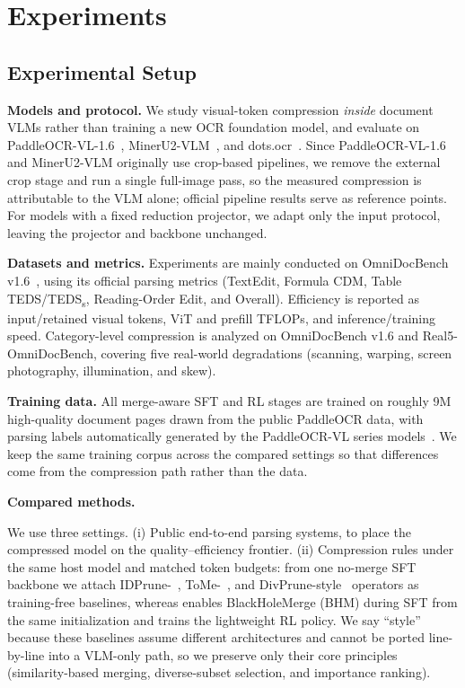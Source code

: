 \section{Experiments}
\label{sec:experiments}

\subsection{Experimental Setup}

\textbf{Models and protocol.}
We study visual-token compression \emph{inside} document VLMs rather than training a new OCR foundation model, and evaluate \ours{} on PaddleOCR-VL-1.6~\cite{cui2026paddleocrvl}, MinerU2-VLM~\cite{mineru2vlm2025}, and dots.ocr~\cite{li2025dotsocr}. Since PaddleOCR-VL-1.6 and MinerU2-VLM originally use crop-based pipelines, we remove the external crop stage and run a single full-image pass, so the measured compression is attributable to the VLM alone; official pipeline results serve as reference points. For models with a fixed reduction projector, we adapt only the input protocol, leaving the projector and backbone unchanged.

\textbf{Datasets and metrics.}
Experiments are mainly conducted on OmniDocBench v1.6~\cite{ouyang2025omnidocbench}, using its official parsing metrics (TextEdit, Formula CDM, Table TEDS/TEDS\textsubscript{s}, Reading-Order Edit, and Overall). Efficiency is reported as input/retained visual tokens, ViT and prefill TFLOPs, and inference/training speed. Category-level compression is analyzed on OmniDocBench v1.6 and Real5-OmniDocBench, covering five real-world degradations (scanning, warping, screen photography, illumination, and skew).

\textbf{Training data.}
All merge-aware SFT and RL stages are trained on roughly 9M high-quality document pages drawn from the public PaddleOCR data, with parsing labels automatically generated by the PaddleOCR-VL series models~\cite{cui2026paddleocrvl}. We keep the same training corpus across the compared settings so that differences come from the compression path rather than the data.

\textbf{Compared methods.}

We use three settings. (i) Public end-to-end parsing systems, to place the compressed model on the quality--efficiency frontier. (ii) Compression rules under the same host model and matched token budgets: from one no-merge SFT backbone we attach IDPrune-~\cite{idpruner2026}, ToMe-~\cite{bolya2023tome}, and DivPrune-style~\cite{alvar2025divprune} operators as training-free baselines, whereas \ours{} enables BlackHoleMerge (BHM) during SFT from the same initialization and trains the lightweight RL policy. We say ``style'' because these baselines assume different architectures and cannot be ported line-by-line into a VLM-only path, so we preserve only their core principles (similarity-based merging, diverse-subset selection, and importance ranking).

